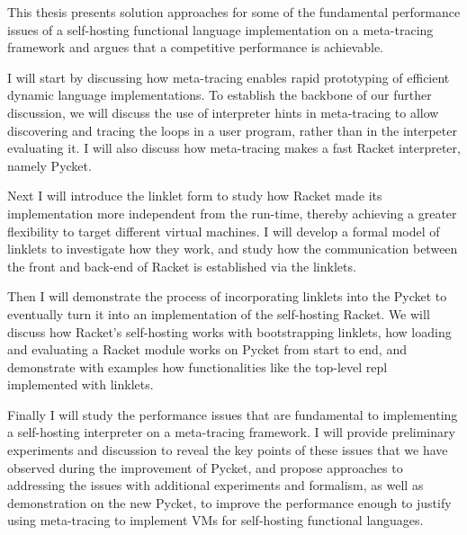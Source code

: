 This thesis presents solution approaches for some of the fundamental
performance issues of a self-hosting functional language
implementation on a meta-tracing framework and argues that a
competitive performance is achievable.

I will start by discussing how meta-tracing enables rapid prototyping
of efficient dynamic language implementations. To establish the
backbone of our further discussion, we will discuss the use of
interpreter hints in meta-tracing to allow discovering and tracing the
loops in a user program, rather than in the interpeter evaluating
it. I will also discuss how meta-tracing makes a fast Racket
interpreter, namely Pycket.

Next I will introduce the linklet form to study how Racket made its
implementation more independent from the run-time, thereby achieving a
greater flexibility to target different virtual machines. I will
develop a formal model of linklets to investigate how they work, and
study how the communication between the front and back-end of Racket
is established via the linklets.

Then I will demonstrate the process of incorporating linklets into the
Pycket to eventually turn it into an implementation of the
self-hosting Racket. We will discuss how Racket's self-hosting works
with bootstrapping linklets, how loading and evaluating a Racket
module works on Pycket from start to end, and demonstrate with
examples how functionalities like the top-level repl implemented with
linklets.

Finally I will study the performance issues that are fundamental to
implementing a self-hosting interpreter on a meta-tracing framework. I
will provide preliminary experiments and discussion to reveal the key
points of these issues that we have observed during the improvement of
Pycket, and propose approaches to addressing the issues with
additional experiments and formalism, as well as demonstration on the
new Pycket, to improve the performance enough to justify using
meta-tracing to implement VMs for self-hosting functional languages.
